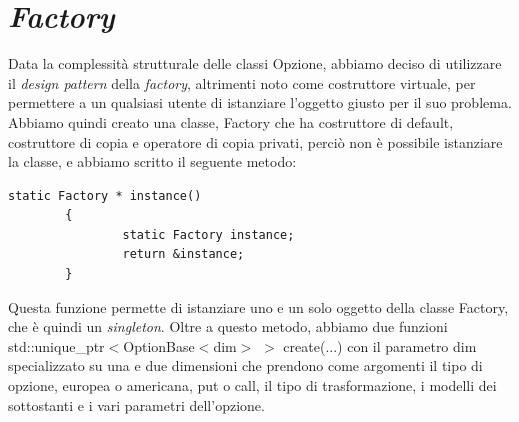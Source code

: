 \documentclass[a4paper,10pt]{report}
\theoremstyle{plain}
\theoremstyle{definition}
\theoremstyle{remark}
\begin{document}
\section{\emph{Factory}}
Data la complessit\`a strutturale delle classi Opzione, abbiamo deciso di utilizzare il \emph{design pattern} della \emph{factory}, altrimenti noto come costruttore virtuale, per permettere a un qualsiasi utente di istanziare l'oggetto giusto per il suo problema. Abbiamo quindi creato una classe, \textsf{Factory} che ha costruttore di default, costruttore di copia e operatore di copia privati, perci\`o non \`e possibile istanziare la classe, e abbiamo scritto il seguente metodo:
\begin{lstlisting}
static Factory * instance()
        {
                static Factory instance;
                return &instance;
        }
\end{lstlisting}
Questa funzione permette di istanziare uno e un solo oggetto della classe \textsf{Factory}, che \`e quindi un \emph{singleton}. Oltre a questo metodo, abbiamo due funzioni \textsf{std::unique\_ptr$<$OptionBase$<$dim$>$ $>$ create(...)} con il parametro \textsf{dim} specializzato su una e due dimensioni che prendono come argomenti il tipo di opzione, europea o americana, put o call, il tipo di trasformazione, i modelli dei sottostanti e i vari parametri dell'opzione.
\end{document}
